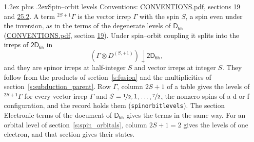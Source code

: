 \documentclass[10pt,a4paper]{article}
\makeatletter
\renewcommand\section{\@startsection{section}{1}{\z@}{-3ex plus -1ex minus -.2ex}%
  {1.2ex plus .2ex}{\normalfont\large\sffamily\bfseries\color{parttitle}}}
\numberwithin{equation}{section}
\newcommand{\grp}[1]{\mathsf{#1}}
\newcommand{\restr}[2]{#1\!\downarrow#2}
\newcommand{\irrJp}[2]{D^{(#1,#2)}}
\newcommand{\irrprod}{\otimes}
\newcommand{\term}[2]{{}^{#1}#2}
\makeatother
\begin{document}
\section{Spin--orbit levels}\label{s:spin_orbit}
Conventions: \href{../../CONVENTIONS.pdf}{CONVENTIONS.pdf}, sections \href{../../../rotation/CONVENTIONS.pdf\#conv.19}{19} and \href{../../CONVENTIONS.pdf\#conv.25.2}{25.2}.
\leavevmode\label{n:local.spin}\label{n:symbol.term}A term $\term{2S+1}{\Gamma}$ is the vector irrep $\Gamma$ with the spin $S$, a spin even under the inversion, as in the terms of the degenerate levels of \href{../../../rotation/data/pdf/D6h.pdf}{$\grp{D_{6h}}$} (\href{../../CONVENTIONS.pdf}{CONVENTIONS.pdf}, section \href{../../../rotation/CONVENTIONS.pdf\#conv.19}{19}). Under spin--orbit coupling it splits into the irreps of $\grp{2D_{6h}}$ in
\begin{equation}\label{e:spinorbit}\restr{(\Gamma \irrprod \irrJp{S}{+1})}{\grp{2D_{6h}}},\end{equation}
and they are spinor irreps at half-integer $S$ and vector irreps at integer $S$. They follow from the products of section~\ref{s:fusion} and the multiplicities of section~\ref{s:subduction_parent}. Row $\Gamma$, column $2S + 1$ of a table gives the levels of $\term{2S+1}{\Gamma}$ for every vector irrep $\Gamma$ and $S = \nicefrac{1}{2}, 1, \dots, \nicefrac{7}{2}$, the nonzero spins of a d or f configuration, and the record holds them (\texttt{spinorbitlevels}). The section Electronic terms of the document of \href{../../../rotation/data/pdf/D6h.pdf}{$\grp{D_{6h}}$} gives the terms in the same way. For an orbital level of section~\ref{s:spin_orbitals}, column $2S + 1 = 2$ gives the levels of one electron, and that section gives their states.
\end{document}
